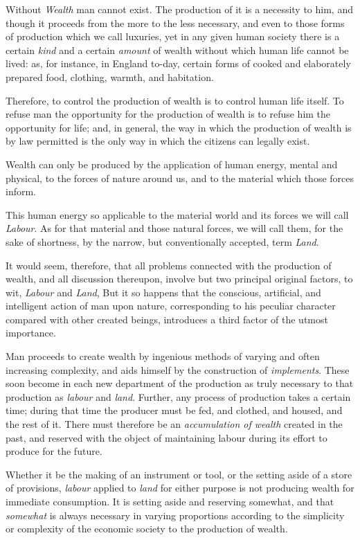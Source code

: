 \documentclass{book}
\begin{document}
Without \emph{Wealth} man cannot exist. The production of it is a necessity to him, and though it proceeds from the more to the less necessary, and even to those forms of production which we call luxuries, yet in any given human society there is a certain \emph{kind} and a certain \emph{amount} of wealth without which human life cannot be lived: as, for instance, in England to-day, certain forms of cooked and elaborately prepared food, clothing, warmth, and habitation.

Therefore, to control the production of wealth is to control human life itself. To refuse man the opportunity for the production of wealth is to refuse him the opportunity for life; and, in general, the way in which the production of wealth is by law permitted is the only way in which the citizens can legally exist.

Wealth can only be produced by the application of human energy, mental and physical, to the forces of nature around us, and to the material which those forces inform.

This human energy so applicable to the material world and its forces we will call \emph{Labour}. As for that material and those natural forces, we will call them, for the sake of shortness, by the narrow, but conventionally accepted, term \emph{Land}.

It would seem, therefore, that all problems connected with the production of wealth, and all discussion thereupon, involve but two principal original factors, to wit, \emph{Labour} and \emph{Land}, But it so happens that the conscious, artificial, and intelligent action of man upon nature, corresponding to his peculiar character compared with other created beings, introduces a third factor of the utmost importance.

Man proceeds to create wealth by ingenious methods of varying and often increasing complexity, and aids himself by the construction of \emph{implements}. These soon become in each new department of the production as truly necessary to that production as \emph{labour} and \emph{land}. Further, any process of production takes a certain time; during that time the producer must be fed, and clothed, and housed, and the rest of it. There must therefore be an \emph{accumulation of wealth} created in the past, and reserved with the object of maintaining labour during its effort to produce for the future.

Whether it be the making of an instrument or tool, or the setting aside of a store of provisions, \emph{labour} applied to \emph{land} for either purpose is not producing wealth for immediate consumption. It is setting aside and reserving somewhat, and that \emph{somewhat} is always necessary in varying proportions according to the simplicity or complexity of the economic society to the production of wealth.
\end{document}
